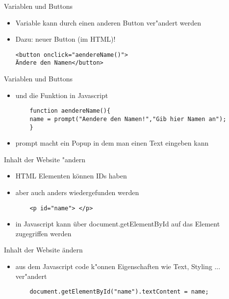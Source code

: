 \documentclass[18pt]{beamer}
\begin{document}
\begin{frame}[fragile]{Variablen und Buttons}
\begin{itemize}
\item Variable kann durch einen anderen Button ver"andert werden
\item Dazu: neuer Button (im HTML)!
\begin{lstlisting}
<button onclick="aendereName()">
Ändere den Namen</button>
\end{lstlisting}
\end{itemize}
\end{frame}


\begin{frame}[fragile]{Variablen und Buttons}
\begin{itemize}
	\item und die Funktion in Javascript 
	\begin{lstlisting}
	function aendereName(){
	name = prompt("Aendere den Namen!","Gib hier Namen an");
	}
	\end{lstlisting}
	\item prompt macht ein Popup in dem man einen Text eingeben kann
\end{itemize}
\end{frame}

\begin{frame}[fragile]{Inhalt der Website "andern}
\begin{itemize}
\item HTML Elementen können IDs haben
\item aber auch anders wiedergefunden werden
\begin{lstlisting}
	<p id="name"> </p>
\end{lstlisting}
\item in Javascript kann über document.getElementById auf das Element zugegriffen werden
\end{itemize}
\end{frame}

\begin{frame}[fragile]{Inhalt der Website ändern}
\begin{itemize}
	\item aus dem Javascript code k"onnen Eigenschaften wie Text, Styling ... ver"andert
	\begin{lstlisting}
	document.getElementById("name").textContent = name;
	\end{lstlisting}
\end{itemize}
\end{frame}
\end{document}
